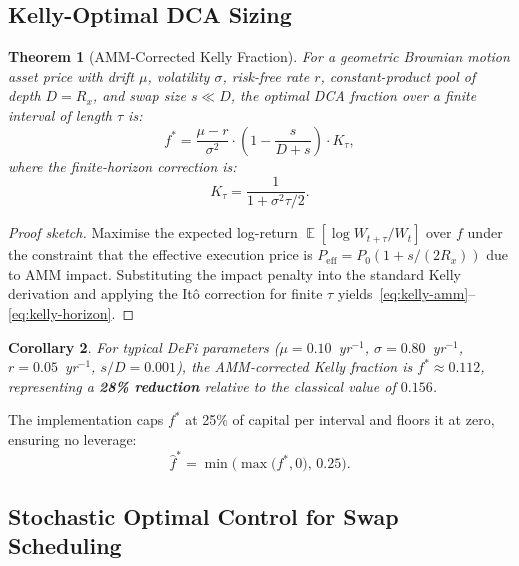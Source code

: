 \documentclass[12pt,a4paper]{article}
\newtheorem{theorem}{Theorem}[section]
\newtheorem{corollary}[theorem]{Corollary}
\DeclareMathOperator{\E}{\mathbb{E}}
\begin{document}
\subsection{Kelly-Optimal DCA Sizing}
\label{sec:kelly}

\begin{theorem}[AMM-Corrected Kelly Fraction]
\label{thm:kelly}
For a geometric Brownian motion asset price with drift $\mu$, volatility
$\sigma$, risk-free rate $r$, constant-product pool of depth $D = R_x$, and
swap size $s \ll D$, the optimal DCA fraction over a finite interval of length
$\tau$ is:
\begin{equation}
f^* = \frac{\mu - r}{\sigma^2} \cdot \left(1 - \frac{s}{D+s}\right) \cdot K_\tau,
\label{eq:kelly-amm}
\end{equation}
where the finite-horizon correction is:
\begin{equation}
K_\tau = \frac{1}{1 + \sigma^2\tau/2}.
\label{eq:kelly-horizon}
\end{equation}
\end{theorem}

\begin{proof}[Proof sketch]
Maximise the expected log-return $\E[\log W_{t+\tau}/W_t]$ over $f$ under the
constraint that the effective execution price is $P_\mathrm{eff} = P_0(1 +
s/(2R_x))$ due to AMM impact.  Substituting the impact penalty into the
standard Kelly derivation and applying the Itô correction for finite $\tau$
yields~\eqref{eq:kelly-amm}--\eqref{eq:kelly-horizon}.
\end{proof}

\begin{corollary}
For typical DeFi parameters ($\mu = 0.10$~yr$^{-1}$, $\sigma = 0.80$~yr$^{-1}$,
$r = 0.05$~yr$^{-1}$, $s/D = 0.001$), the AMM-corrected Kelly fraction is
$f^* \approx 0.112$, representing a \textbf{28\% reduction} relative to the
classical value of $0.156$.
\end{corollary}

The implementation caps $f^*$ at 25\% of capital per interval and floors it
at zero, ensuring no leverage:
\begin{equation}
\hat{f}^* = \min\!\Big(\max\!\big(f^*, 0\big),\, 0.25\Big).
\end{equation}

\subsection{Stochastic Optimal Control for Swap Scheduling}
\end{document}
